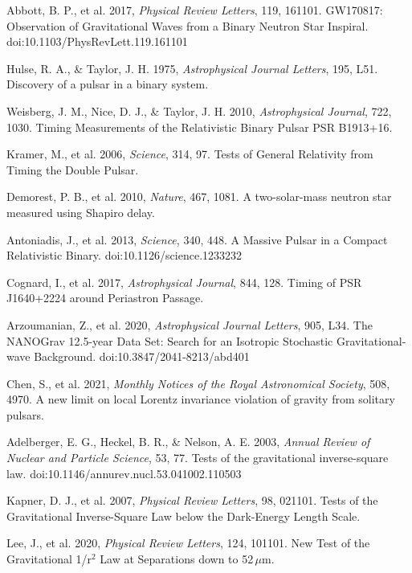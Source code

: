 \documentclass[12pt,a4paper]{article}
\begin{document}
\begin{thebibliography}{99}
 Abbott, B. P., et al. 2017, \textit{Physical Review Letters}, 119, 161101. GW170817: Observation of Gravitational Waves from a Binary Neutron Star Inspiral. doi:10.1103/PhysRevLett.119.161101

 Hulse, R. A., \& Taylor, J. H. 1975, \textit{Astrophysical Journal Letters}, 195, L51. Discovery of a pulsar in a binary system.

 Weisberg, J. M., Nice, D. J., \& Taylor, J. H. 2010, \textit{Astrophysical Journal}, 722, 1030. Timing Measurements of the Relativistic Binary Pulsar PSR B1913+16.

 Kramer, M., et al. 2006, \textit{Science}, 314, 97. Tests of General Relativity from Timing the Double Pulsar.

 Demorest, P. B., et al. 2010, \textit{Nature}, 467, 1081. A two-solar-mass neutron star measured using Shapiro delay.

 Antoniadis, J., et al. 2013, \textit{Science}, 340, 448. A Massive Pulsar in a Compact Relativistic Binary. doi:10.1126/science.1233232

 Cognard, I., et al. 2017, \textit{Astrophysical Journal}, 844, 128. Timing of PSR J1640+2224 around Periastron Passage.

 Arzoumanian, Z., et al. 2020, \textit{Astrophysical Journal Letters}, 905, L34. The NANOGrav 12.5-year Data Set: Search for an Isotropic Stochastic Gravitational-wave Background. doi:10.3847/2041-8213/abd401

 Chen, S., et al. 2021, \textit{Monthly Notices of the Royal Astronomical Society}, 508, 4970. A new limit on local Lorentz invariance violation of gravity from solitary pulsars.

 Adelberger, E. G., Heckel, B. R., \& Nelson, A. E. 2003, \textit{Annual Review of Nuclear and Particle Science}, 53, 77. Tests of the gravitational inverse-square law. doi:10.1146/annurev.nucl.53.041002.110503

 Kapner, D. J., et al. 2007, \textit{Physical Review Letters}, 98, 021101. Tests of the Gravitational Inverse-Square Law below the Dark-Energy Length Scale.

 Lee, J., et al. 2020, \textit{Physical Review Letters}, 124, 101101. New Test of the Gravitational 1/r$^2$ Law at Separations down to 52\,$\mu$m.


\end{thebibliography}
\end{document}
